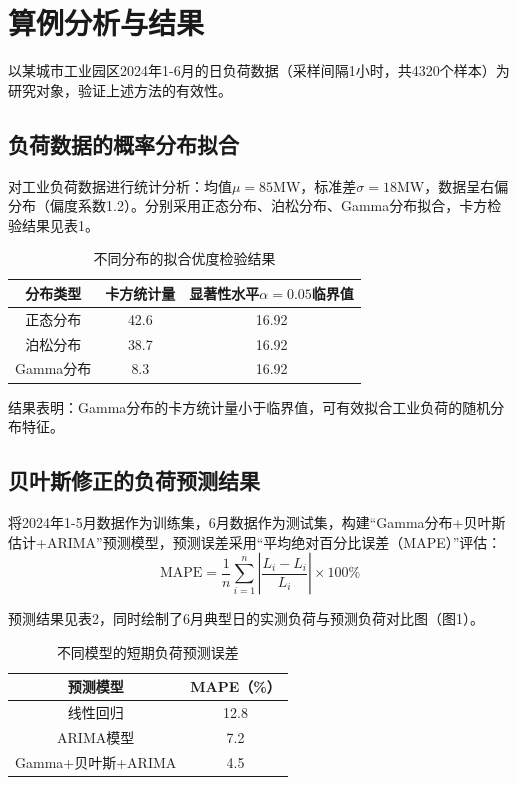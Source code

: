 \documentclass[12pt,a4paper]{article}
\begin{document}
\section{算例分析与结果}
以某城市工业园区2024年1-6月的日负荷数据（采样间隔1小时，共4320个样本）为研究对象，验证上述方法的有效性。

\subsection{负荷数据的概率分布拟合}
对工业负荷数据进行统计分析：均值$\mu=85$MW，标准差$\sigma=18$MW，数据呈右偏分布（偏度系数1.2）。分别采用正态分布、泊松分布、Gamma分布拟合，卡方检验结果见表1。

\begin{table}[H]
\centering
\caption{不同分布的拟合优度检验结果}
\begin{tabular}{c|c|c}
\hline
分布类型 & 卡方统计量 & 显著性水平$\alpha=0.05$临界值 \\
\hline
正态分布 & 42.6 & 16.92 \\
泊松分布 & 38.7 & 16.92 \\
Gamma分布 & 8.3 & 16.92 \\
\hline
\end{tabular}
\end{table}

结果表明：Gamma分布的卡方统计量小于临界值，可有效拟合工业负荷的随机分布特征。

\subsection{贝叶斯修正的负荷预测结果}
将2024年1-5月数据作为训练集，6月数据作为测试集，构建“Gamma分布+贝叶斯估计+ARIMA”预测模型，预测误差采用“平均绝对百分比误差（MAPE）”评估：
\[
\text{MAPE} = \frac{1}{n}\sum_{i=1}^n \left|\frac{L_i - \hat{L}_i}{L_i}\right| \times 100\%
\]

预测结果见表2，同时绘制了6月典型日的实测负荷与预测负荷对比图（图1）。

\begin{table}[H]
\centering
\caption{不同模型的短期负荷预测误差}
\begin{tabular}{c|c}
\hline
预测模型 & MAPE（\%） \\
\hline
线性回归 & 12.8 \\
ARIMA模型 & 7.2 \\
Gamma+贝叶斯+ARIMA & 4.5 \\
\hline
\end{tabular}
\end{table}
\end{document}
